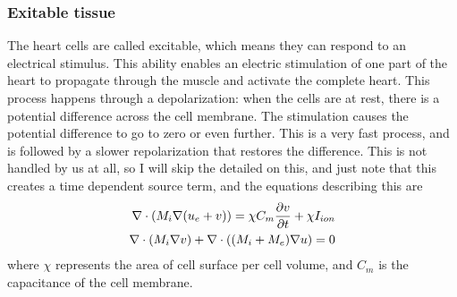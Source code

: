 \subsubsection{Exitable tissue}
The heart cells are called excitable, which means they can respond to an electrical stimulus. This ability enables an electric stimulation of one part of the heart to propagate through the muscle and activate the complete heart. This process happens through a depolarization: when the cells are at rest, there is a potential difference across the cell membrane. The stimulation causes the potential difference to go to zero or even further. This is a very fast process, and is followed by a slower repolarization that restores the difference. This is not handled by us at all, so I will skip the detailed on this, and just note that this creates a time dependent source term, and the equations describing this are
\begin{align}
 \nabla \cdot (M_i \nabla (u_e + v)) = \chi C_m {\partial v \over \partial t} + \chi I_{ion} \\
 \nabla \cdot (M_i \nabla v) + \nabla \cdot ((M_i + M_e)\nabla u) = 0
\end{align}
where $\chi$ represents the area of cell surface per cell volume, and $C_m$ is the capacitance of the cell membrane. 


